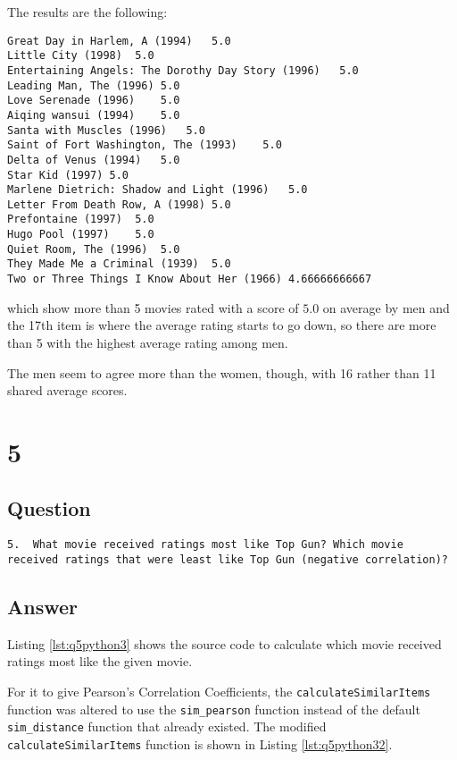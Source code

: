 \documentclass[letterpaper,11pt]{article}
\begin{document}
The results are the following:
\begin{lstlisting}[frame=single]
Great Day in Harlem, A (1994)	5.0
Little City (1998)	5.0
Entertaining Angels: The Dorothy Day Story (1996)	5.0
Leading Man, The (1996)	5.0
Love Serenade (1996)	5.0
Aiqing wansui (1994)	5.0
Santa with Muscles (1996)	5.0
Saint of Fort Washington, The (1993)	5.0
Delta of Venus (1994)	5.0
Star Kid (1997)	5.0
Marlene Dietrich: Shadow and Light (1996) 	5.0
Letter From Death Row, A (1998)	5.0
Prefontaine (1997)	5.0
Hugo Pool (1997)	5.0
Quiet Room, The (1996)	5.0
They Made Me a Criminal (1939)	5.0
Two or Three Things I Know About Her (1966)	4.66666666667
\end{lstlisting}
which show more than 5 movies rated with a score of $5.0$  on average by men and the 17th item is where the average rating starts to go down, so there are more than 5 with the highest average rating among men.

The men seem to agree more than the women, though, with 16 rather than 11 shared average scores.

\newpage

\section*{5}

\subsection*{Question}

\begin{verbatim}
5.  What movie received ratings most like Top Gun? Which movie
received ratings that were least like Top Gun (negative correlation)?
\end{verbatim}

\newpage
\subsection*{Answer}

Listing \ref{lst:q5python3} shows the source code to calculate which movie received ratings most like the given movie.

For it to give Pearson's Correlation Coefficients, the \verb+calculateSimilarItems+ function was altered to use the \verb+sim_pearson+ function instead of the default \verb+sim_distance+ function that already existed.  The modified \verb+calculateSimilarItems+ function is shown in Listing \ref{lst:q5python32}.
\end{document}

